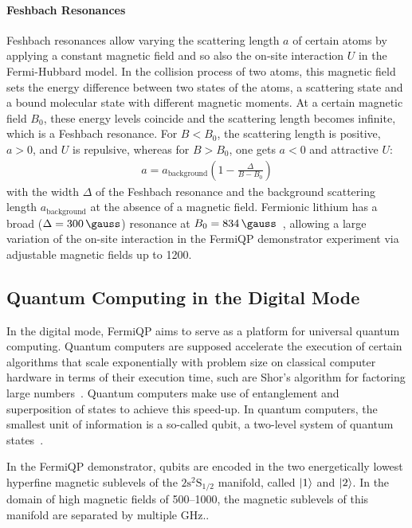 \paragraph*{Feshbach Resonances} Feshbach resonances allow varying the scattering length $a$ of certain atoms by applying a constant magnetic field and so also the on-site interaction $U$ in the Fermi-Hubbard model. In the collision process of two atoms, this magnetic field sets the energy difference between two states of the atoms, a scattering state and a bound molecular state with different magnetic moments. At a certain magnetic field $B_0$, these energy levels coincide and the scattering length becomes infinite, which is a Feshbach resonance. For $B < B_0$, the scattering length is positive, $a > 0$, and $U$ is repulsive, whereas for $B > B_0$, one gets $a < 0$ and attractive $U$:
\begin{align}
    a = a_\text{background} \left(1 - \frac{\Delta}{B-B_0}\right)
\end{align}
with the width $\Delta$ of the Feshbach resonance and the background scattering length $a_\text{background}$ at the absence of a magnetic field. Fermionic lithium has a broad ($\Delta = \SI[]{300}{\gauss}$) resonance at $B_0 = \SI[]{834}{\gauss}$~\cite{chin_feshbach_2010}, allowing a large variation of the on-site interaction in the FermiQP demonstrator experiment via adjustable magnetic fields up to \SI[]{1200}{\gauss}.

\subsection*{Quantum Computing in the Digital Mode}\label{ch:digital_mode}
In the digital mode, FermiQP aims to serve as a platform for universal quantum computing. Quantum computers are supposed accelerate the execution of certain algorithms that scale exponentially with problem size on classical computer hardware in terms of their execution time, such are Shor's algorithm for factoring large numbers~\cite{shor_algorithms_1994}. Quantum computers make use of entanglement and superposition of states to achieve this speed-up. In quantum computers, the smallest unit of information is a so-called qubit, a two-level system of quantum states~\cite{hidary_quantum_2021, mainzer_quantencomputer_2020}.

In the FermiQP demonstrator, qubits are encoded in the two energetically lowest hyperfine magnetic sublevels of the $2\text{s}^2\text{S}_{1/2}$ manifold, called $\Ket{1}$ and $\Ket{2}$. In the domain of high magnetic fields of \SIrange[]{500}{1000}{\gauss}, the magnetic sublevels of this manifold are separated by multiple \si[]{\giga\hertz}.\cite{gehm_properties_2003,wei_magnetic-field_2013}.

